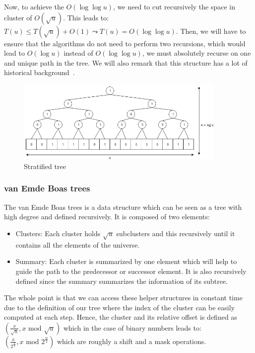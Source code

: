 Now, to achieve the $O(\log \log u)$, we need to cut recursively the space in cluster of $O(\sqrt{u})$. This leads to: $T(u) \leq T(\sqrt{u}) + O(1) \leadsto T(u) = O(\log \log u)$. Then, we will have to ensure that the algorithms do not need to perform two recursions, which would lead to $O(\log u)$ instead of $O(\log \log u)$, we must absolutely recurse on one and unique path in the tree. We will also remark that this structure has a lot of historical background~\cite{van2013thirty}.

\begin{figure}[!h]
   \caption{Stratified tree}
   \label{fig:vEB}
   \centering
   \includegraphics[width=0.9\textwidth]{stratified-tree.png}
\end{figure}

\subsubsection{van Emde Boas trees}

The van Emde Boas trees is a data structure which can be seen as a tree with high degree and defined recursively. It is composed of two elements:
\begin{itemize}
    \item Clusters: Each cluster holds $\sqrt{u}$ subclusters and this recursively until it contains all the elements of the universe.
    \item Summary: Each cluster is summarized by one element which will help to guide the path to the predecessor or successor element. It is also recursively defined since the summary summarizes the information of its subtree.
\end{itemize}

The whole point is that we can access these helper structures in constant time due to the definition of our tree where the index of the cluster can be easily computed at each step. Hence, the cluster and its relative offset is defined as $(\frac{x}{\sqrt{u}}, x \text{ mod } \sqrt{u})$ which in the case of binary numbers leads to: $(\frac{x}{2^{\frac{w}{2}}}, x \text{ mod } 2^{\frac{w}{2}})$ which are roughly a shift and a mask operations.

